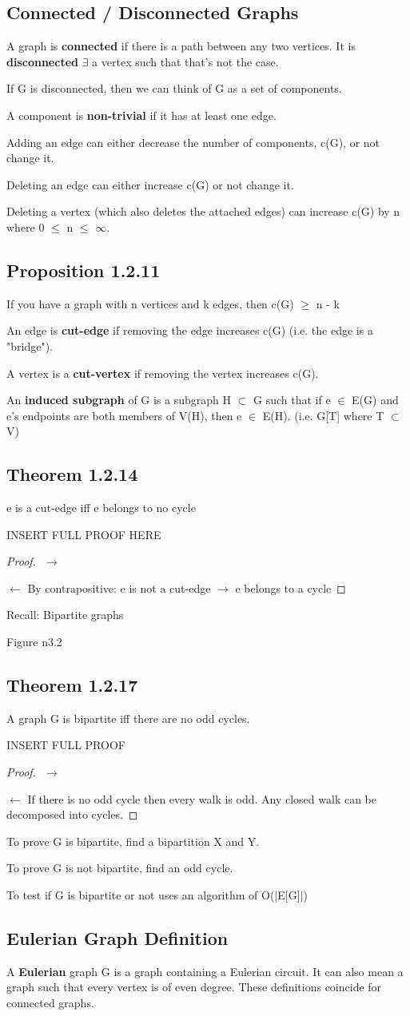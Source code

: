 \documentclass{article}
\newcommand{\mt}[1]{\ensuremath{#1}}
\newcommand\ssc[2][\DefaultOpt]{%
  \def\DefaultOpt{#2}%
  \subsection[#1]{#2}%
}
\newcommand{\bgpf}{\begin{proof} $ $\newline}
\newcommand{\epf}{\end{proof}}
\newcommand{\mem}{\mt{\in} }
\newcommand{\exs}{\mt{\exists} }
\newcommand{\sbs}{\mt{\subset} }         %
\newcommand{\lra}{ \mt{\longrightarrow} } %
\newcommand{\lla}{ \mt{\longleftarrow} }  %
\newcommand{\av}[1]{\mt{|}#1\mt{|}}  %
\newcommand{\ms}{\mt{\operatorname{-}} }
\newcommand{\lse}{\mt{\operatorname{\leq}} }
\newcommand{\gre}{\mt{\operatorname{\geq}} }
\begin{document}
{\ssc{Connected / Disconnected Graphs}{
A graph is \textbf{connected} if there is a path between any two vertices. It is \textbf{disconnected} \exs a vertex such that that's not the case.

If G is disconnected, then we can think of G as a set of components.

A component is \textbf{non-trivial} if it has at least one edge.

Adding an edge can either decrease the number of components, c(G), or not change it.

Deleting an edge can either increase c(G) or not change it.

Deleting a vertex (which also deletes the attached edges) can increase c(G) by n where 0 \lse n \lse $\infty$.
}

\ssc{Proposition 1.2.11}{
If you have a graph with n vertices and k edges, then c(G) \gre n \ms k
}

An edge is \textbf{cut-edge} if removing the edge increases c(G) (i.e. the edge is a "bridge").

A vertex is a \textbf{cut-vertex} if removing the vertex increases c(G).

An \textbf{induced subgraph} of G is a subgraph H \sbs G such that if e \mem E(G) and e's endpoints are both members of V(H), then e \mem E(H). (i.e. G[T] where T \sbs V)

\ssc{Theorem 1.2.14}{
e is a cut-edge iff e belongs to no cycle

INSERT FULL PROOF HERE
\bgpf
\lra 

\lla
By contrapositive: e is not a cut-edge \lra e belongs to a cycle
\epf

Recall: Bipartite graphs

Figure n3.2

}

\ssc{Theorem 1.2.17}{
A graph G is bipartite iff there are no odd cycles.

INSERT FULL PROOF
\bgpf 
\lra 

\lla
If there is no odd cycle then every walk is odd.
Any closed walk can be decomposed into cycles.
\epf 

To prove G is bipartite, find a bipartition X and Y.

To prove G is not bipartite, find an odd cycle.

To test if G is bipartite or not uses an algorithm of O(\av{E[G]})
}

\ssc{Eulerian Graph Definition}{

A \textbf{Eulerian} graph G is a graph containing a Eulerian circuit. It can also mean a graph such that every vertex is of even degree. These definitions coincide for connected graphs.

}}
\end{document}
